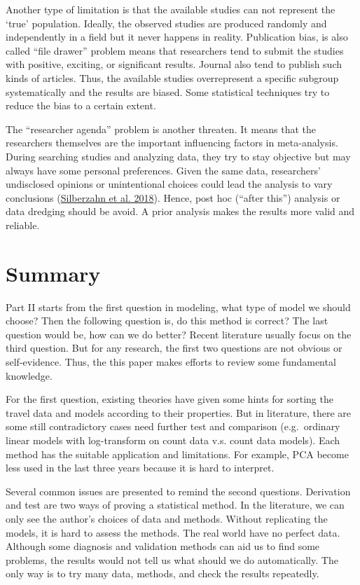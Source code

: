 \documentclass[
  11pt,
  openany]{memoir}
\begin{document}
Another type of limitation is that the available studies can not represent the `true' population.
Ideally, the observed studies are produced randomly and independently in a field but it never happens in reality.
Publication bias, is also called ``file drawer'' problem means that researchers tend to submit the studies with positive, exciting, or significant results.
Journal also tend to publish such kinds of articles.
Thus, the available studies overrepresent a specific subgroup systematically and the results are biased.
Some statistical techniques try to reduce the bias to a certain extent.

The ``researcher agenda'' problem is another threaten. It means that the researchers themselves are the important influencing factors in meta-analysis.
During searching studies and analyzing data, they try to stay objective but may always have some personal preferences.
Given the same data, researchers' undisclosed opinions or unintentional choices could lead the analysis to vary conclusions (\protect\hyperlink{ref-silberzahnManyAnalystsOne2018}{Silberzahn et al. 2018}).
Hence, post hoc (``after this'') analysis or data dredging should be avoid.
A prior analysis makes the results more valid and reliable.

\hypertarget{summary}{%
\chapter{Summary}\label{summary}}

Part II starts from the first question in modeling, what type of model we should choose?
Then the following question is, do this method is correct?
The last question would be, how can we do better?
Recent literature usually focus on the third question.
But for any research, the first two questions are not obvious or self-evidence.
Thus, the this paper makes efforts to review some fundamental knowledge.

For the first question, existing theories have given some hints for sorting the travel data and models according to their properties.
But in literature, there are some still contradictory cases need further test and comparison (e.g.~ordinary linear models with log-transform on count data v.s. count data models).
Each method has the suitable application and limitations. For example, PCA become less used in the last three years because it is hard to interpret.

Several common issues are presented to remind the second questions.
Derivation and test are two ways of proving a statistical method. In the literature, we can only see the author's choices of data and methods. Without replicating the models, it is hard to assess the methods.
The real world have no perfect data. Although some diagnosis and validation methods can aid us to find some problems, the results would not tell us what should we do automatically. The only way is to try many data, methods, and check the results repeatedly.
\end{document}
